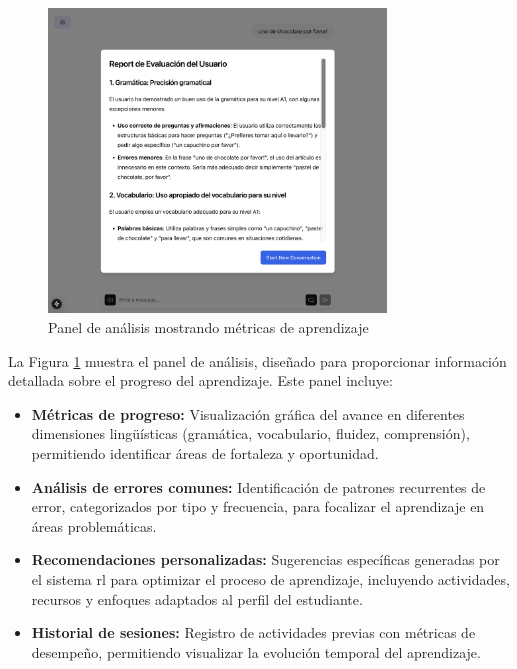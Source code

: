 \begin{figure}[H]
    \centering
    \includegraphics[width=0.8\textwidth]{figuras/screenshots/report.png}
    \caption{Panel de análisis mostrando métricas de aprendizaje}
    \label{fig:analytics-panel}
\end{figure}

La Figura \ref{fig:analytics-panel} muestra el panel de análisis, diseñado para proporcionar información detallada sobre el progreso del aprendizaje. Este panel incluye:

\begin{itemize}
    \item \textbf{Métricas de progreso:} Visualización gráfica del avance en diferentes dimensiones lingüísticas (gramática, vocabulario, fluidez, comprensión), permitiendo identificar áreas de fortaleza y oportunidad.
    
    \item \textbf{Análisis de errores comunes:} Identificación de patrones recurrentes de error, categorizados por tipo y frecuencia, para focalizar el aprendizaje en áreas problemáticas.
    
    \item \textbf{Recomendaciones personalizadas:} Sugerencias específicas generadas por el sistema \gls{rl} para optimizar el proceso de aprendizaje, incluyendo actividades, recursos y enfoques adaptados al perfil del estudiante.
    
    \item \textbf{Historial de sesiones:} Registro de actividades previas con métricas de desempeño, permitiendo visualizar la evolución temporal del aprendizaje.
\end{itemize}

